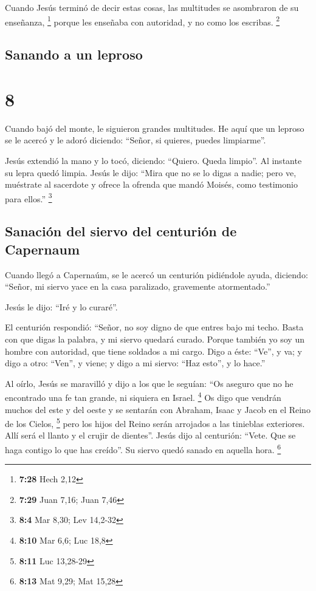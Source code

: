  Cuando Jesús terminó de decir estas cosas, las
multitudes se asombraron de su enseñanza, \footnote{\textbf{7:28} Hech
  2,12}  porque les enseñaba con autoridad, y no como los
escribas. \footnote{\textbf{7:29} Juan 7,16; Juan 7,46}

\hypertarget{sanando-a-un-leproso}{%
\subsection{Sanando a un leproso}\label{sanando-a-un-leproso}}

\hypertarget{section-7}{%
\section{8}\label{section-7}}

 Cuando bajó del monte, le siguieron grandes multitudes.
 He aquí que un leproso se le acercó y le adoró diciendo:
``Señor, si quieres, puedes limpiarme''.

 Jesús extendió la mano y lo tocó, diciendo: ``Quiero.
Queda limpio''. Al instante su lepra quedó limpia.  Jesús
le dijo: ``Mira que no se lo digas a nadie; pero ve, muéstrate al
sacerdote y ofrece la ofrenda que mandó Moisés, como testimonio para
ellos.'' \footnote{\textbf{8:4} Mar 8,30; Lev 14,2-32}

\hypertarget{sanaciuxf3n-del-siervo-del-centuriuxf3n-de-capernaum}{%
\subsection{Sanación del siervo del centurión de
Capernaum}\label{sanaciuxf3n-del-siervo-del-centuriuxf3n-de-capernaum}}

 Cuando llegó a Capernaúm, se le acercó un centurión
pidiéndole ayuda,  diciendo: ``Señor, mi siervo yace en la
casa paralizado, gravemente atormentado.''

 Jesús le dijo: ``Iré y lo curaré''.

 El centurión respondió: ``Señor, no soy digno de que
entres bajo mi techo. Basta con que digas la palabra, y mi siervo
quedará curado.  Porque también yo soy un hombre con
autoridad, que tiene soldados a mi cargo. Digo a éste: ``Ve'', y va; y
digo a otro: ``Ven'', y viene; y digo a mi siervo: ``Haz esto'', y lo
hace.''

 Al oírlo, Jesús se maravilló y dijo a los que le
seguían: ``Os aseguro que no he encontrado una fe tan grande, ni
siquiera en Israel. \footnote{\textbf{8:10} Mar 6,6; Luc 18,8}
 Os digo que vendrán muchos del este y del oeste y se
sentarán con Abraham, Isaac y Jacob en el Reino de los Cielos,
\footnote{\textbf{8:11} Luc 13,28-29}  pero los hijos del
Reino serán arrojados a las tinieblas exteriores. Allí será el llanto y
el crujir de dientes''.  Jesús dijo al centurión: ``Vete.
Que se haga contigo lo que has creído''. Su siervo quedó sanado en
aquella hora. \footnote{\textbf{8:13} Mat 9,29; Mat 15,28}

